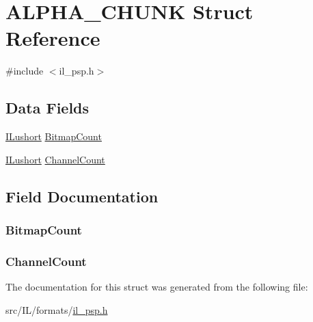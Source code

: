 \hypertarget{struct_a_l_p_h_a___c_h_u_n_k}{\section{A\-L\-P\-H\-A\-\_\-\-C\-H\-U\-N\-K Struct Reference}
\label{struct_a_l_p_h_a___c_h_u_n_k}
}


{\ttfamily \#include $<$il\-\_\-psp.\-h$>$}

\subsection*{Data Fields}
\begin{DoxyCompactItemize}
\item 
\hyperlink{il_8h_af6287b43748354a7c4864da43ae56962}{I\-Lushort} \hyperlink{struct_a_l_p_h_a___c_h_u_n_k_a399127cf328f78728a0fb797a048b047}{Bitmap\-Count}
\item 
\hyperlink{il_8h_af6287b43748354a7c4864da43ae56962}{I\-Lushort} \hyperlink{struct_a_l_p_h_a___c_h_u_n_k_a6014a35aa20b07a3281b6b1035f7bc35}{Channel\-Count}
\end{DoxyCompactItemize}


\subsection{Field Documentation}
\hypertarget{struct_a_l_p_h_a___c_h_u_n_k_a399127cf328f78728a0fb797a048b047}{
\subsubsection[{Bitmap\-Count}]{ Bitmap\-Count}}\label{struct_a_l_p_h_a___c_h_u_n_k_a399127cf328f78728a0fb797a048b047}
\hypertarget{struct_a_l_p_h_a___c_h_u_n_k_a6014a35aa20b07a3281b6b1035f7bc35}{
\subsubsection[{Channel\-Count}]{ Channel\-Count}}\label{struct_a_l_p_h_a___c_h_u_n_k_a6014a35aa20b07a3281b6b1035f7bc35}


The documentation for this struct was generated from the following file\-:\begin{DoxyCompactItemize}
\item 
src/\-I\-L/formats/\hyperlink{il__psp_8h}{il\-\_\-psp.\-h}\end{DoxyCompactItemize}
